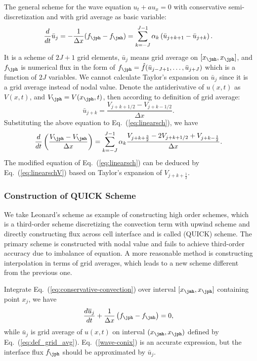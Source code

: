 \documentclass[]{article}
\begin{document}
The general scheme for the wave equation $u_t+a u_x=0$ with
conservative semi-discretization and with grid average as basic variable:
\begin{equation}
    \frac{d}{dt}\bar u_j = -\frac{1}{\Delta x}(f_{\jph}-f_{\jmh})=\sum_{k=-J}^{J-1}\alpha_k\left(\bar u_{j+k+1}-\bar u_{j+k}\right).
    \label{eq:linearsch}
\end{equation}
It is a scheme of $2J+1$ grid elements, $\bar u_j$ means grid
average on $[x_{\jmh}, x_\jph]$, and $f_\jph$ is numerical flux in the
form of $f_{\jph} = \hat f(\bar u_{j-J+1},\ldots,\bar u_{j+J})$ which
is a function of $2J$ variables.
We cannot calculate Taylor's expansion on $\bar u_j$ since it is a
grid average instead of nodal value. Denote the antiderivative of
$u(x,t)$ as $V(x,t)$, and $V_\jph = V(x_\jph,t)$, then according to
definition of grid average:
\begin{equation}
    \bar u_{j+k}=\frac{V_{j+k+1/2}-V_{j+k-1/2}}{\Delta x}.
    \label{eq:ujkV}
\end{equation}
Substituting the above equation to Eq.~(\ref{eq:linearsch}), we have 
\begin{equation}
    \frac{d}{dt}\left(\frac{V_{\jph}-V_{\jmh}}{\Delta x}\right)=\sum_{k=-J}^{J-1}\alpha_k\frac{V_{j+k+\frac{3}{2}}-2V_{j+k+1/2}+V_{j+k-\frac{1}{2}}}{\Delta x}.
    \label{eq:linearschV}
\end{equation}
The modified equation of Eq.~(\ref{eq:linearsch}) can be deduced by
Eq.~(\ref{eq:linearschV}) based on Taylor's expansion of $V_{j+k+\frac 12}$.

\subsubsection{Construction of QUICK Scheme}
\label{sec:construct-quick}

We take Leonard's scheme \cite{leonard1979stable}
as example of constructing high order schemes, which is a third-order scheme
discretizing the convection term with upwind scheme and directly constructing
flux across cell interface and is called (QUICK) scheme.
The primary scheme is constructed with nodal value
and fails to achieve third-order accuracy due to imbalance of equation.
A more reasonable method is constructing interpolation in terms of grid 
averages,
which leads to a new scheme different from the previous one.

Integrate Eq.~(\ref{eq:conservative-convection}) over 
interval $[x_\jmh, x_\jph]$ containing point $x_j$, we have
\begin{equation}
    \frac{d \overline{u}_j}{d t}+\frac{1}{\Delta x}\left(f_{\jph}-f_{\jmh}\right)=0,
    \label{wave-conix}
\end{equation}
while $\bar u_j$ is grid average of $u(x,t)$ on interval $(x_\jmh,x_\jph)$
defined by Eq.~(\ref{eq:def_grid_avg}). Eq.~(\ref{wave-conix}) is an accurate
expression, but the interface flux $f_\jph$ should be approximated by $\bar
u_j$. 
\end{document}
